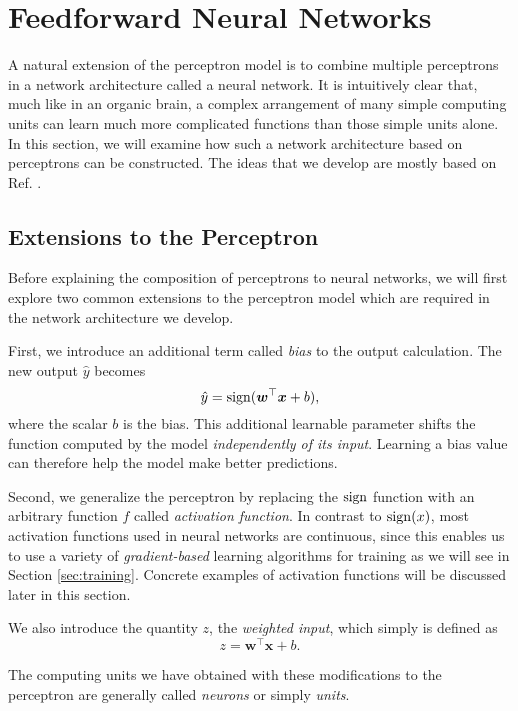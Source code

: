 \section{Feedforward Neural Networks}
\label{sec:feedforward_neural_networks}
A natural extension of the perceptron model is to combine multiple perceptrons in a network architecture called a neural network. It is intuitively clear that, much like in an organic brain, a complex arrangement of many simple computing units can learn much more complicated functions than those simple units alone. In this section, we will examine how such a network architecture based on perceptrons can be constructed. The ideas that we develop are mostly based on Ref. \cite[Ch.\,6]{DBLP:books/daglib/0040158}.

\subsection{Extensions to the Perceptron}
Before explaining the composition of perceptrons to neural networks, we will first explore two common extensions to the perceptron model which are required in the network architecture we develop.

First, we introduce an additional term called \emph{bias} to the output calculation. The new output $\hat{y}$ becomes
\begin{equation}\label{eq:perceptron2}
\hat{y} = \operatorname{sign}(\bm{w}^\top\bm{x} + b),
\end{equation}
where the scalar $b$ is the bias. This additional learnable parameter shifts the function computed by the model \emph{independently of its input}. Learning a bias value can therefore help the model make better predictions.

Second, we generalize the perceptron by replacing the $\operatorname{sign}$ function with an arbitrary function $f$ called \emph{activation function}. In contrast to $\operatorname{sign}(x)$, most activation functions used in neural networks are continuous, since this enables us to use a variety of \emph{gradient-based} learning algorithms for training as we will see in Section \ref{sec:training}. Concrete examples of activation functions will be discussed later in this section.

We also introduce the quantity $z$, the \emph{weighted input}, which simply is defined as
\begin{equation}\label{eq:perceptron3}
z = \bm{w}^\top\bm{x} + b.
\end{equation}

The computing units we have obtained with these modifications to the perceptron are generally called \emph{neurons} or simply \emph{units}.

